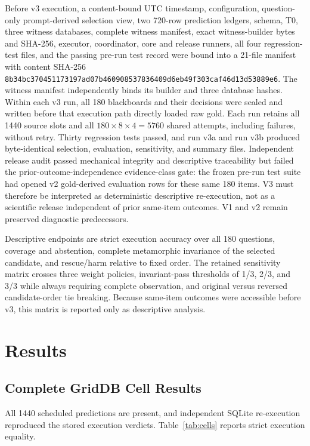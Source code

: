 \documentclass[applsci,article,submit,moreauthors]{Definitions/mdpi}
\begin{document}
Before v3 execution, a content-bound UTC timestamp, configuration, question-only prompt-derived selection view, two 720-row prediction ledgers, schema, T0, three witness databases, complete witness manifest, exact witness-builder bytes and SHA-256, executor, coordinator, core and release runners, all four regression-test files, and the passing pre-run test record were bound into a 21-file manifest with content SHA-256 \texttt{8b34bc370451173197ad07b460908537836409d6eb49f303caf46d13d53889e6}. The witness manifest independently binds its builder and three database hashes. Within each v3 run, all 180 blackboards and their decisions were sealed and written before that execution path directly loaded raw gold. Each run retains all 1440 source slots and all $180\times8\times4=5760$ shared attempts, including failures, without retry. Thirty regression tests passed, and run v3a and run v3b produced byte-identical selection, evaluation, sensitivity, and summary files. Independent release audit passed mechanical integrity and descriptive traceability but failed the prior-outcome-independence evidence-class gate: the frozen pre-run test suite had opened v2 gold-derived evaluation rows for these same 180 items. V3 must therefore be interpreted as deterministic descriptive re-execution, not as a scientific release independent of prior same-item outcomes. V1 and v2 remain preserved diagnostic predecessors.

Descriptive endpoints are strict execution accuracy over all 180 questions, coverage and abstention, complete metamorphic invariance of the selected candidate, and rescue/harm relative to fixed order. The retained sensitivity matrix crosses three weight policies, invariant-pass thresholds of 1/3, 2/3, and 3/3 while always requiring complete observation, and original versus reversed candidate-order tie breaking. Because same-item outcomes were accessible before v3, this matrix is reported only as descriptive analysis.

\section{Results}

\subsection{Complete GridDB Cell Results}

All 1440 scheduled predictions are present, and independent SQLite re-execution reproduced the stored execution verdicts. Table~\ref{tab:cells} reports strict execution equality.
\end{document}
